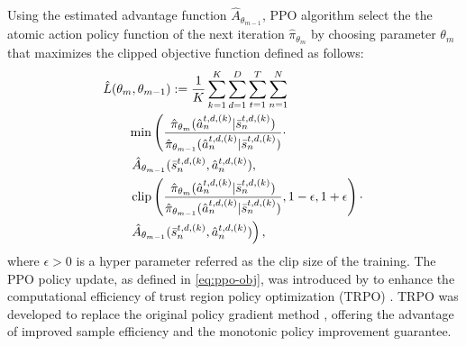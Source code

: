 Using the estimated advantage function $\hat{A}_{\theta_{m-1}}$, PPO algorithm select the the atomic action policy function of the next iteration $\hat{\pi}_{\theta_m}$ by choosing parameter $\theta_m$ that maximizes the clipped objective function defined as follows:
\begin{align}
    &\hat{L}(\theta_m, \theta_{m-1}) := \frac{1}{K}\sum_{k = 1}^K \sum_{d = 1}^{D} \sum_{t = 1}^{T} \sum_{n = 1}^{N} \nonumber \\
    &\qquad \min\left(\frac{\hat{\pi}_{\theta_m}(\hat{a}^{t,d, (k)}_{n} \vert \bar{s}^{t,d, (k)}_{n})}{\hat{\pi}_{\theta_{m-1}}(\hat{a}^{t,d, (k)}_{n} \vert \bar{s}^{t,d, (k)}_{n})} \cdot \right. \nonumber\\
    &\qquad \left. \hat{A}_{\theta_{m-1}}(\bar{s}^{t,d, (k)}_{n}, \hat{a}^{t,d, (k)}_{n}), \right. \nonumber \\
    &\qquad \left. \text{clip}\left(\frac{\hat{\pi}_{\theta_m}(\hat{a}^{t,d, (k)}_{n} \vert \bar{s}^{t,d, (k)}_{n})}{\hat{\pi}_{\theta_{m-1}}(\hat{a}^{t,d, (k)}_{n} \vert \bar{s}^{t,d, (k)}_{n})}, 1 - \epsilon, 1 + \epsilon \right) \cdot \right. \nonumber\\
    &\qquad \left. \hat{A}_{\theta_{m-1}}(\bar{s}^{t,d, (k)}_{n}, \hat{a}^{t,d, (k)}_{n}) \right), \label{eq:ppo-obj}
\end{align}
where $\epsilon>0$ is a hyper parameter referred as the clip size of the training. The PPO policy update, as defined in \eqref{eq:ppo-obj}, was introduced by \citep{schulman2017proximal} to enhance the computational efficiency of trust region policy optimization (TRPO) \cite{schulman2015trust}. TRPO was developed to replace the original policy gradient method \cite{sutton1999policy}, offering the advantage of improved sample efficiency and the monotonic policy improvement guarantee. 



